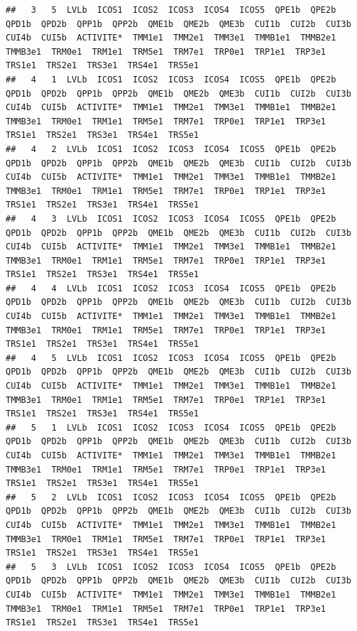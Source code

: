 \documentclass[11pt,a4paper, x11names]{article}\usepackage[]{graphicx}\usepackage[]{color}
\makeatletter
\newenvironment{kframe}{%
 \def\at@end@of@kframe{}%
 \ifinner\ifhmode%
  \def\at@end@of@kframe{\end{minipage}}%
  \begin{minipage}{\columnwidth}%
 \fi\fi%
 \def\FrameCommand##1{\hskip\@totalleftmargin \hskip-\fboxsep
 \colorbox{shadecolor}{##1}\hskip-\fboxsep
     \hskip-\linewidth \hskip-\@totalleftmargin \hskip\columnwidth}%
 \MakeFramed {\advance\hsize-\width
   \@totalleftmargin\z@ \linewidth\hsize
   \@setminipage}}%
 {\par\unskip\endMakeFramed%
 \at@end@of@kframe}
\newenvironment{knitrout}{}{} %
\makeatother
\begin{document}
\begin{knitrout}
\begin{kframe}
\begin{verbatim}
##   3   5  LVLb  ICOS1  ICOS2  ICOS3  ICOS4  ICOS5  QPE1b  QPE2b  QPD1b  QPD2b  QPP1b  QPP2b  QME1b  QME2b  QME3b  CUI1b  CUI2b  CUI3b  CUI4b  CUI5b  ACTIVITE*  TMM1e1  TMM2e1  TMM3e1  TMMB1e1  TMMB2e1  TMMB3e1  TRM0e1  TRM1e1  TRM5e1  TRM7e1  TRP0e1  TRP1e1  TRP3e1  TRS1e1  TRS2e1  TRS3e1  TRS4e1  TRS5e1
##   4   1  LVLb  ICOS1  ICOS2  ICOS3  ICOS4  ICOS5  QPE1b  QPE2b  QPD1b  QPD2b  QPP1b  QPP2b  QME1b  QME2b  QME3b  CUI1b  CUI2b  CUI3b  CUI4b  CUI5b  ACTIVITE*  TMM1e1  TMM2e1  TMM3e1  TMMB1e1  TMMB2e1  TMMB3e1  TRM0e1  TRM1e1  TRM5e1  TRM7e1  TRP0e1  TRP1e1  TRP3e1  TRS1e1  TRS2e1  TRS3e1  TRS4e1  TRS5e1
##   4   2  LVLb  ICOS1  ICOS2  ICOS3  ICOS4  ICOS5  QPE1b  QPE2b  QPD1b  QPD2b  QPP1b  QPP2b  QME1b  QME2b  QME3b  CUI1b  CUI2b  CUI3b  CUI4b  CUI5b  ACTIVITE*  TMM1e1  TMM2e1  TMM3e1  TMMB1e1  TMMB2e1  TMMB3e1  TRM0e1  TRM1e1  TRM5e1  TRM7e1  TRP0e1  TRP1e1  TRP3e1  TRS1e1  TRS2e1  TRS3e1  TRS4e1  TRS5e1
##   4   3  LVLb  ICOS1  ICOS2  ICOS3  ICOS4  ICOS5  QPE1b  QPE2b  QPD1b  QPD2b  QPP1b  QPP2b  QME1b  QME2b  QME3b  CUI1b  CUI2b  CUI3b  CUI4b  CUI5b  ACTIVITE*  TMM1e1  TMM2e1  TMM3e1  TMMB1e1  TMMB2e1  TMMB3e1  TRM0e1  TRM1e1  TRM5e1  TRM7e1  TRP0e1  TRP1e1  TRP3e1  TRS1e1  TRS2e1  TRS3e1  TRS4e1  TRS5e1
##   4   4  LVLb  ICOS1  ICOS2  ICOS3  ICOS4  ICOS5  QPE1b  QPE2b  QPD1b  QPD2b  QPP1b  QPP2b  QME1b  QME2b  QME3b  CUI1b  CUI2b  CUI3b  CUI4b  CUI5b  ACTIVITE*  TMM1e1  TMM2e1  TMM3e1  TMMB1e1  TMMB2e1  TMMB3e1  TRM0e1  TRM1e1  TRM5e1  TRM7e1  TRP0e1  TRP1e1  TRP3e1  TRS1e1  TRS2e1  TRS3e1  TRS4e1  TRS5e1
##   4   5  LVLb  ICOS1  ICOS2  ICOS3  ICOS4  ICOS5  QPE1b  QPE2b  QPD1b  QPD2b  QPP1b  QPP2b  QME1b  QME2b  QME3b  CUI1b  CUI2b  CUI3b  CUI4b  CUI5b  ACTIVITE*  TMM1e1  TMM2e1  TMM3e1  TMMB1e1  TMMB2e1  TMMB3e1  TRM0e1  TRM1e1  TRM5e1  TRM7e1  TRP0e1  TRP1e1  TRP3e1  TRS1e1  TRS2e1  TRS3e1  TRS4e1  TRS5e1
##   5   1  LVLb  ICOS1  ICOS2  ICOS3  ICOS4  ICOS5  QPE1b  QPE2b  QPD1b  QPD2b  QPP1b  QPP2b  QME1b  QME2b  QME3b  CUI1b  CUI2b  CUI3b  CUI4b  CUI5b  ACTIVITE*  TMM1e1  TMM2e1  TMM3e1  TMMB1e1  TMMB2e1  TMMB3e1  TRM0e1  TRM1e1  TRM5e1  TRM7e1  TRP0e1  TRP1e1  TRP3e1  TRS1e1  TRS2e1  TRS3e1  TRS4e1  TRS5e1
##   5   2  LVLb  ICOS1  ICOS2  ICOS3  ICOS4  ICOS5  QPE1b  QPE2b  QPD1b  QPD2b  QPP1b  QPP2b  QME1b  QME2b  QME3b  CUI1b  CUI2b  CUI3b  CUI4b  CUI5b  ACTIVITE*  TMM1e1  TMM2e1  TMM3e1  TMMB1e1  TMMB2e1  TMMB3e1  TRM0e1  TRM1e1  TRM5e1  TRM7e1  TRP0e1  TRP1e1  TRP3e1  TRS1e1  TRS2e1  TRS3e1  TRS4e1  TRS5e1
##   5   3  LVLb  ICOS1  ICOS2  ICOS3  ICOS4  ICOS5  QPE1b  QPE2b  QPD1b  QPD2b  QPP1b  QPP2b  QME1b  QME2b  QME3b  CUI1b  CUI2b  CUI3b  CUI4b  CUI5b  ACTIVITE*  TMM1e1  TMM2e1  TMM3e1  TMMB1e1  TMMB2e1  TMMB3e1  TRM0e1  TRM1e1  TRM5e1  TRM7e1  TRP0e1  TRP1e1  TRP3e1  TRS1e1  TRS2e1  TRS3e1  TRS4e1  TRS5e1

\end{verbatim}
\end{kframe}
\end{knitrout}
\end{document}
